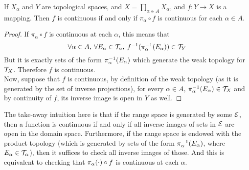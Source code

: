 \documentclass[../../main.tex]{subfiles}
\begin{document}
\begin{wts}
    If $X_\alpha$ and $Y$ are topological spaces, and $X = \prod_{\alpha\in A}X_\alpha$, and $f:Y\to X$ is a mapping. Then $f$ is continuous if and only if $\pi_\alpha\circ f$ is continuous for each $\alpha\in A$.
\end{wts}
\begin{proof}
    If $\pi_\alpha\circ f$ is continuous at each $\alpha$, this means that
    \[
    \forall \alpha\in A, \:\forall E_\alpha\in\mathcal{T}_\alpha,\: f^{-1}(\pi_{\alpha}^{-1}({E_\alpha}))\in \mathcal{T}_Y
    \]
    But it is exactly sets of the form $\pi_{\alpha}^{-1}({E_\alpha})$ which generate the weak topology for $\mathcal{T}_X$. Therefore $f$ is continuous.\\
    
    Now, suppose that $f$ is continuous, by definition of the weak topology (as it is generated by the set of inverse projections), for every $\alpha\in A$, $\pi_{\alpha}^{-1}({E_\alpha})\in \mathcal{T}_X$ and by continuity of $f$, its inverse image is open in $Y$ as well.
\end{proof}
\remark The take-away intuition here is that if the range space is generated by some $\mathcal{E}$, then a function is continuous if and only if all inverse images of sets in $\mathcal{E}$ are open in the domain space. Furthermore, if the range space is endowed with the product topology (which is generated by sets of the form $\pi_{\alpha}^{-1}({E_\alpha})$, where $E_\alpha\in \mathcal{T}_\alpha$), then it suffices to check all inverse images of those. And this is equivalent to checking that $\pi_{\alpha}({\cdot})\circ f$ is continuous at each $\alpha$.
\end{document}
